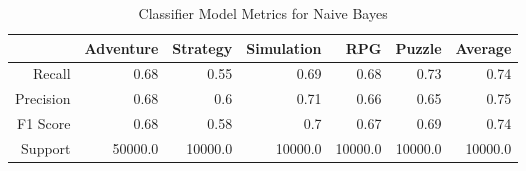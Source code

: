 \begin{table}[h]
    \centering
    \begin{tabular}{r|r|r|r|r|r|r}
        & Adventure & Strategy & Simulation & RPG & Puzzle & Average \\\hline
        Recall      & 0.68 & 0.55 & 0.69 & 0.68 & 0.73 & 0.74\\
        Precision   & 0.68 & 0.6 & 0.71 & 0.66 & 0.65 & 0.75\\
        F1 Score    & 0.68 & 0.58 & 0.7 & 0.67 & 0.69 & 0.74\\
        Support     & 50000.0 & 10000.0 & 10000.0 & 10000.0 & 10000.0 & 10000.0
\end{tabular}
    \caption{Classifier Model Metrics for Naive Bayes}
    \label{tab:model_metrics}
\end{table}
